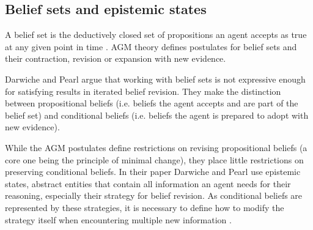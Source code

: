 \documentclass[english, 12pt]{scrartcl}
\theoremstyle{definition}
\theoremstyle{definition}
\theoremstyle{definition}
\begin{document}
\subsection{Belief sets and epistemic states}
A belief set is the deductively closed set of propositions an agent accepts as true at any given point in time \cite{Ferme2011}. AGM theory \cite{Alchourron1985} defines postulates for belief sets and their contraction, revision or expansion with new evidence.


Darwiche and Pearl \cite{Darwiche1997} argue that working with belief sets is not expressive enough for satisfying results in iterated belief revision. They make the distinction between propositional beliefs (i.e. beliefs the agent accepts and are part of the belief set) and conditional beliefs (i.e. beliefs the agent is prepared to adopt with new evidence).

While the AGM postulates define restrictions on revising propositional beliefs (a core one being the principle of minimal change), they place little restrictions on preserving conditional beliefs. In their paper Darwiche and Pearl use epistemic states, abstract entities that contain all information an agent needs for their reasoning, especially their strategy for belief revision. As conditional beliefs are represented by these strategies, it is necessary to define how to modify the strategy itself when encountering multiple new information \cite{Darwiche1997}.
\end{document}
